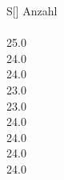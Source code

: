 \begin{table}\caption{Die Anzahl der Impulse bei einer Druckdifferenz von $\Delta p= \SI{0.6}{\bar}$.}
\label{tabb}
\centering
{}
\begin{tabular}{S[]} 
\toprule
{Anzahl} \\
 \\
25.0 \\
24.0 \\
24.0 \\
23.0 \\
23.0 \\
24.0 \\
24.0 \\
24.0 \\
24.0 \\
\bottomrule
\end{tabular}\end{table}